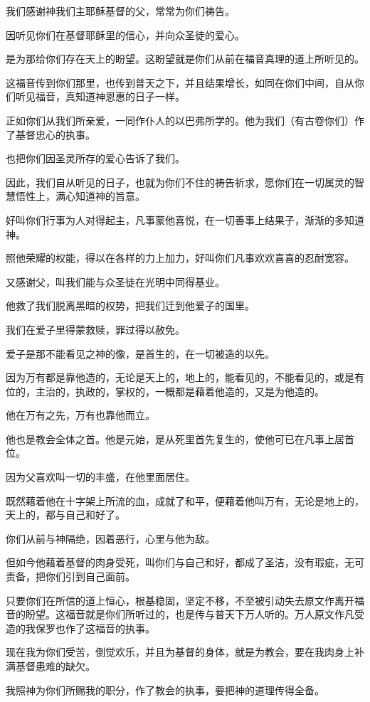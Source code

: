 \documentclass[12pt,oneside]{book}
\begin{document}
我们感谢神我们主耶稣基督的父，常常为你们祷告。

因听见你们在基督耶稣里的信心，并向众圣徒的爱心。

是为那给你们存在天上的盼望。这盼望就是你们从前在福音真理的道上所听见的。

这福音传到你们那里，也传到普天之下，并且结果增长，如同在你们中间，自从你们听见福音，真知道神恩惠的日子一样。

正如你们从我们所亲爱，一同作仆人的以巴弗所学的。他为我们（有古卷你们）作了基督忠心的执事。

也把你们因圣灵所存的爱心告诉了我们。

因此，我们自从听见的日子，也就为你们不住的祷告祈求，愿你们在一切属灵的智慧悟性上，满心知道神的旨意。

好叫你们行事为人对得起主，凡事蒙他喜悦，在一切善事上结果子，渐渐的多知道神。

照他荣耀的权能，得以在各样的力上加力，好叫你们凡事欢欢喜喜的忍耐宽容。

又感谢父，叫我们能与众圣徒在光明中同得基业。

他救了我们脱离黑暗的权势，把我们迁到他爱子的国里。

我们在爱子里得蒙救赎，罪过得以赦免。

爱子是那不能看见之神的像，是首生的，在一切被造的以先。

因为万有都是靠他造的，无论是天上的，地上的，能看见的，不能看见的，或是有位的，主治的，执政的，掌权的，一概都是藉着他造的，又是为他造的。

他在万有之先，万有也靠他而立。

他也是教会全体之首。他是元始，是从死里首先复生的，使他可已在凡事上居首位。

因为父喜欢叫一切的丰盛，在他里面居住。

既然藉着他在十字架上所流的血，成就了和平，便藉着他叫万有，无论是地上的，天上的，都与自己和好了。

你们从前与神隔绝，因着恶行，心里与他为敌。

但如今他藉着基督的肉身受死，叫你们与自己和好，都成了圣洁，没有瑕疵，无可责备，把你们引到自己面前。

只要你们在所信的道上恒心，根基稳固，坚定不移，不至被引动失去原文作离开福音的盼望。这福音就是你们所听过的，也是传与普天下万人听的。万人原文作凡受造的我保罗也作了这福音的执事。

现在我为你们受苦，倒觉欢乐，并且为基督的身体，就是为教会，要在我肉身上补满基督患难的缺欠。

我照神为你们所赐我的职分，作了教会的执事，要把神的道理传得全备。
\end{document}
